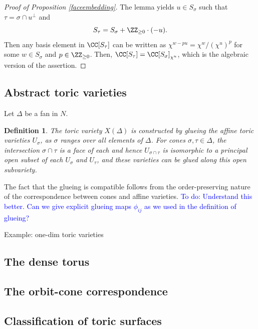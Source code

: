\documentclass[12pt]{amsart}
\newcommand{\todo}[1]{\noindent  \textcolor{blue}{To do: #1}}
\theoremstyle{plain}
\newtheorem{definition}[theorem]{Definition}
\begin{document}
\begin{proof}[Proof of Proposition \ref{faceembedding}]
The lemma yields $u \in S_\sigma$ such that $\tau=\sigma\cap u^\perp$ and
$$S_\tau = S_\sigma + \ZZ_{\ge 0} \cdot (-u).$$
Then any basis element in $\CC[S_\tau]$ can be written as $\chi^{w - p u} = \chi^w / (\chi^u)^p$ for some $w \in S_\sigma$ and $p \in \ZZ_{\ge 0}$.
Then, $\CC[S_\tau] = \CC[S_\sigma]_{\chi^u}$, which is the algebraic version of the assertion.
\end{proof}


\subsection{Abstract toric varieties}
Let $\Delta$ be a fan in $N$.

\begin{definition}
The toric variety $X(\Delta)$ is constructed by glueing the affine toric varieties $U_\sigma$, as $\sigma$ ranges over all elements of $\Delta$.
For cones $\sigma, \tau \in \Delta$, the intersection $\sigma \cap \tau$ is a face of each and hence $U_{\sigma \cap \tau}$ is isomorphic to a principal open subset of each $U_\sigma$ and $U_\tau$, and these varieties can be glued along this open subvariety.
\end{definition}

The fact that the glueing is compatible follows from the order-preserving nature of the correspondence between cones and affine varieties.
\todo{Understand this better. Can we give explicit glueing maps $\phi_{ij}$ as we used in the definition of glueing?}

Example: one-dim toric varieties

\subsection{The dense torus}



\subsection{The orbit-cone correspondence}



\subsection{Classification of toric surfaces}
\end{document}
